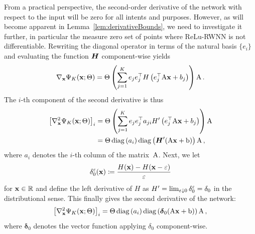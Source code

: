 From a practical perspective, the second-order derivative of the network with respect to the input will be zero for all intents and purposes. 
However, as will become apparent in Lemma~\ref{lem:derivativeBounds}, we need to investigate it further, in particular the measure zero set of points where ReLu-RWNN is not differentiable. Rewriting the diagonal operator in terms of the natural basis $\{e_{i}\}$ and evaluating the function $\boldsymbol{H}$ component-wise yields
$$
\nabla_{\mathbf{x}}\Psi_K(\mathbf{x}; \Theta)=\Theta \left(\sum_{j=1}^{K} e_{j} e_{j}^\top H\left(e_{j}^\top \mathrm{A} \mathbf{x}+b_{j}\right) \right) \mathrm{A}\,.
$$
The $i$-th component of the second derivative is thus
\begin{align*}
\left[\nabla_{\mathbf{x}}^2\Psi_K(\mathbf{x}; \Theta)\right]_i
&= \Theta\left( \sum_{j=1}^{K} e_{j} e_{j}^\top a_{j i}H'\left(e_{j}^\top \mathrm{A} \mathbf{x}+b_{j}\right)\right)\mathrm{A} \\
&= \Theta \operatorname{diag} \left(a_{i}\right) \operatorname{diag} \left(\boldsymbol{H}'(\mathrm{A} \mathbf{x}+\mathrm{b})\right) \mathrm{A}\,,
\end{align*}
where $a_i$ denotes the $i$-th column of the matrix~$\mathrm{A}$. 
Next, we let
$$\delta_0^{\varepsilon}(\mathbf{x}) \coloneqq \frac{H(\mathbf{x})-H(\mathbf{x}-\varepsilon)}{\varepsilon}$$
for $\mathbf{x}\in\mathbb{R}$ and define the left derivative of $H$ as $H'=\lim_{\varepsilon\downarrow 0}\delta_0^\varepsilon=\delta_0$ in the distributional sense. This finally gives the second derivative of the network:
$$
\left[\nabla_{\mathbf{x}}^2\Psi_K(\mathbf{x}; \Theta)\right]_i
 = \Theta\operatorname{diag}\left(a_{i}\right)\operatorname{diag}\left(\boldsymbol\delta_0(\mathrm{A} \mathbf{x}+\mathrm{b})\right) \mathrm{A}\,,
$$
where $\boldsymbol \delta_0$ denotes the vector function applying $\delta_0$ component-wise.


